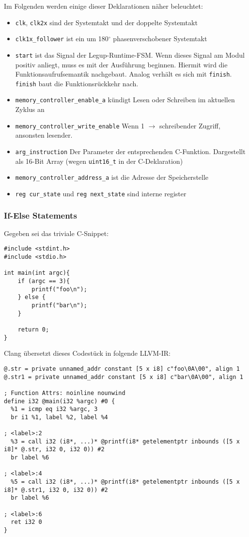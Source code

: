 \documentclass[oneside,a4paper]{article}
\def\V#1{\lstinline[style=verilog]{#1}}
\def\C#1{\lstinline[style=c]{#1}}
\begin{document}
Im Folgenden werden einige dieser Deklarationen näher beleuchtet:
\begin{itemize}
  \item \V{clk}, \V{clk2x} sind der Systemtakt und der doppelte Systemtakt
    \item \V{clk1x_follower} ist ein um 180\(^\circ\) phasenverschobener Systemtakt
    \item \V{start} ist das Signal der Legup-Runtime-FSM. Wenn dieses Signal
      am Modul positiv anliegt, muss es mit der Ausführung beginnen.
      Hiermit wird die Funktionsaufrufsemantik nachgebaut. Analog verhält es
      sich mit \V{finish}. \V{finish} baut die Funktionsrückkehr nach.
    \item \V{memory_controller_enable_a} kündigt Lesen oder Schreiben im aktuellen Zyklus an
    \item \V{memory_controller_write_enable} Wenn 1 \(\to\) schreibender Zugriff, ansonsten lesender.
    \item \V{arg_instruction} Der Parameter der entsprechenden C-Funktion. Dargestellt als
      16-Bit Array (wegen \C{uint16_t} in der C-Deklaration)
    \item \V{memory_controller_address_a} ist die Adresse der Speicherstelle
    \item \V{reg cur_state} und \V{reg next_state} sind interne register
\end{itemize}

\subsubsection{If-Else Statements}

Gegeben sei das triviale C-Snippet:
\begin{lstlisting}[style=c]
#include <stdint.h>
#include <stdio.h>

int main(int argc){
    if (argc == 3){
        printf("foo\n");
    } else {
        printf("bar\n");
    }

    return 0;
}
\end{lstlisting}

Clang übersetzt dieses Codestück in folgende LLVM-IR:
\begin{lstlisting}[style=asm]
@.str = private unnamed_addr constant [5 x i8] c"foo\0A\00", align 1
@.str1 = private unnamed_addr constant [5 x i8] c"bar\0A\00", align 1

; Function Attrs: noinline nounwind
define i32 @main(i32 %argc) #0 {
  %1 = icmp eq i32 %argc, 3
  br i1 %1, label %2, label %4

; <label>:2
  %3 = call i32 (i8*, ...)* @printf(i8* getelementptr inbounds ([5 x i8]* @.str, i32 0, i32 0)) #2
  br label %6

; <label>:4
  %5 = call i32 (i8*, ...)* @printf(i8* getelementptr inbounds ([5 x i8]* @.str1, i32 0, i32 0)) #2
  br label %6

; <label>:6
  ret i32 0
}
\end{lstlisting}
\end{document}
